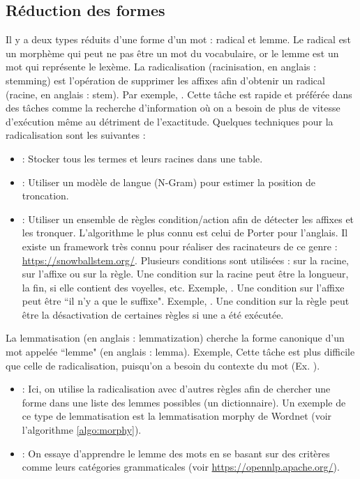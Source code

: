 \documentclass{KodeBook}
\begin{document}
\subsection{Réduction des formes}

Il y a deux types réduits d'une forme d'un mot : radical et lemme. 
Le radical est un morphème qui peut ne pas être un mot du vocabulaire, or le lemme est un mot qui représente le lexème.
La radicalisation (racinisation, en anglais : stemming) est l'opération de supprimer les affixes afin d'obtenir un radical (racine, en anglais : stem). 
Par exemple, . 
Cette tâche est rapide et préférée dans des tâches comme la recherche d'information où on a besoin de plus de vitesse d'exécution même au détriment de l'exactitude. 
Quelques techniques pour la radicalisation sont les suivantes :
\begin{itemize}
	\item {} : Stocker tous les termes et leurs racines dans une table. 
	\item {} : Utiliser un modèle de langue (N-Gram) pour estimer la position de troncation.
	\item {} : Utiliser un ensemble de règles condition/action afin de détecter les affixes et les tronquer. 
	L'algorithme le plus connu est celui de Porter \cite{1980-porter} pour l'anglais. 
	Il existe un framework très connu pour réaliser des racinateurs de ce genre : \url{https://snowballstem.org/}. 
	Plusieurs conditions sont utilisées : sur la racine, sur l'affixe ou sur la règle. 
	Une condition sur la racine peut être la longueur, la fin, si elle contient des voyelles, etc.
	Exemple, .
	Une condition sur l'affixe peut être ``il n'y a que le suffixe".
	Exemple, .
	Une condition sur la règle peut être la désactivation de certaines règles si une a été exécutée.
\end{itemize}

La lemmatisation (en anglais : lemmatization) cherche la forme canonique d'un mot appelée ``lemme" (en anglais : lemma).
Exemple, 
Cette tâche est plus difficile que celle de radicalisation, puisqu'on a besoin du contexte du mot (Ex. ). 
\begin{itemize}
	\item {} : Ici, on utilise la radicalisation avec d'autres règles afin de chercher une forme dans une liste des lemmes possibles (un dictionnaire).
	Un exemple de ce type de lemmatisation est la lemmatisation morphy de Wordnet (voir l'algorithme \ref{algo:morphy}).
	
	\item {} : On essaye d'apprendre le lemme des mots en se basant sur des critères comme leurs catégories grammaticales (voir \url{https://opennlp.apache.org/}).

\end{itemize}
\end{document}
